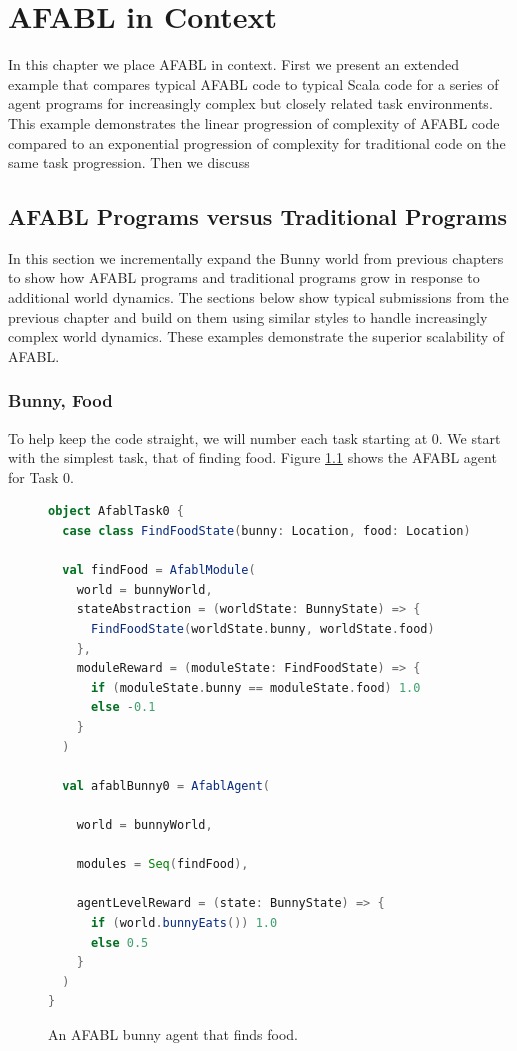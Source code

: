 \chapter{AFABL in Context}\label{ch:afabl-context}

In this chapter we place AFABL in context. First we present an extended example that compares typical AFABL code to typical Scala code for a series of agent programs for increasingly complex but closely related task environments. This example demonstrates the linear progression of complexity of AFABL code compared to an exponential progression of complexity for traditional code on the same task progression. Then we discuss

\section{AFABL Programs versus Traditional Programs}

In this section we incrementally expand the Bunny world from previous chapters to show how AFABL programs and traditional programs grow in response to additional world dynamics. The sections below show typical submissions from the previous chapter and build on them using similar styles to handle increasingly complex world dynamics. These examples demonstrate the superior scalability of AFABL.

\subsection{Bunny, Food}

To help keep the code straight, we will number each task starting at 0. We start with the simplest task, that of finding food. Figure \ref{fig:afabl0} shows the AFABL agent for Task 0.

\begin{figure}[h]
\begin{lstlisting}[language=Scala]
object AfablTask0 {
  case class FindFoodState(bunny: Location, food: Location)

  val findFood = AfablModule(
    world = bunnyWorld,
    stateAbstraction = (worldState: BunnyState) => {
      FindFoodState(worldState.bunny, worldState.food)
    },
    moduleReward = (moduleState: FindFoodState) => {
      if (moduleState.bunny == moduleState.food) 1.0
      else -0.1
    }
  )

  val afablBunny0 = AfablAgent(

    world = bunnyWorld,

    modules = Seq(findFood),

    agentLevelReward = (state: BunnyState) => {
      if (world.bunnyEats()) 1.0
      else 0.5
    }
  )
}
\end{lstlisting}
\caption{An AFABL bunny agent that finds food.}
\label{fig:afabl0}
\end{figure}


